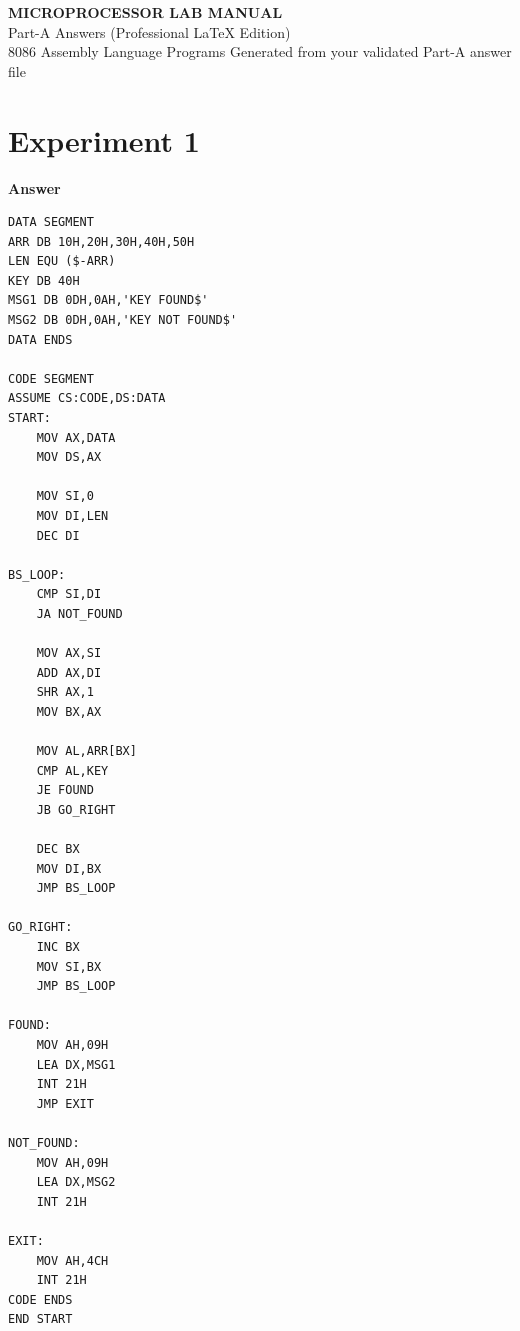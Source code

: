 \documentclass[11pt,a4paper]{article}
\begin{document}
\begin{titlepage}
\centering
{\Huge\bfseries MICROPROCESSOR LAB MANUAL\\[0.6em]}
{\Large Part-A Answers (Professional LaTeX Edition)\\[1.2em]}
{\large 8086 Assembly Language Programs}
\vfill
{\large Generated from your validated Part-A answer file}
\end{titlepage}

\tableofcontents
\newpage
\section*{Experiment 1}
\noindent{}
\vspace{0.4em}
\noindent\textbf{Answer}
\begin{lstlisting}[style=asmbase]
DATA SEGMENT
ARR DB 10H,20H,30H,40H,50H
LEN EQU ($-ARR)
KEY DB 40H
MSG1 DB 0DH,0AH,'KEY FOUND$'
MSG2 DB 0DH,0AH,'KEY NOT FOUND$'
DATA ENDS

CODE SEGMENT
ASSUME CS:CODE,DS:DATA
START:
    MOV AX,DATA
    MOV DS,AX

    MOV SI,0
    MOV DI,LEN
    DEC DI

BS_LOOP:
    CMP SI,DI
    JA NOT_FOUND

    MOV AX,SI
    ADD AX,DI
    SHR AX,1
    MOV BX,AX

    MOV AL,ARR[BX]
    CMP AL,KEY
    JE FOUND
    JB GO_RIGHT

    DEC BX
    MOV DI,BX
    JMP BS_LOOP

GO_RIGHT:
    INC BX
    MOV SI,BX
    JMP BS_LOOP

FOUND:
    MOV AH,09H
    LEA DX,MSG1
    INT 21H
    JMP EXIT

NOT_FOUND:
    MOV AH,09H
    LEA DX,MSG2
    INT 21H

EXIT:
    MOV AH,4CH
    INT 21H
CODE ENDS
END START
\end{lstlisting}
\end{document}
